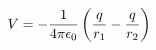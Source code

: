 \documentclass[preview]{standalone}
\begin{document}
\begin{align*}
V  =  -{1  \over   4\pi\epsilon_0}  \left( \frac{q}{r_1} - \frac{q}{r_2} \right)
\end{align*}
\end{document}
